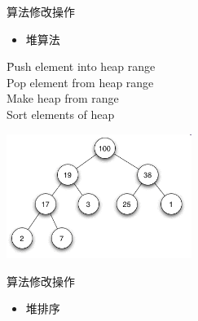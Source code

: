 \begin{frame}[t, fragile]{算法}{修改操作}
  \begin{itemize}
  \item 堆算法
  \end{itemize}
  \begin{tabbing}
     \hspace{4em} \= Push element into heap range\\ 
     \> Pop element from heap range\\ 
     \> Make heap from range\\ 
     \> Sort elements of heap 
  \end{tabbing}
  \begin{center}
    \includegraphics[width=0.45\textwidth]{figure/chap07/10heap}
  \end{center}
\end{frame}

\begin{frame}[t, fragile, ]{算法}{修改操作}
  \begin{itemize}
  \item 堆排序
  \end{itemize}
  \begin{center}
  \end{center}
\end{frame}

